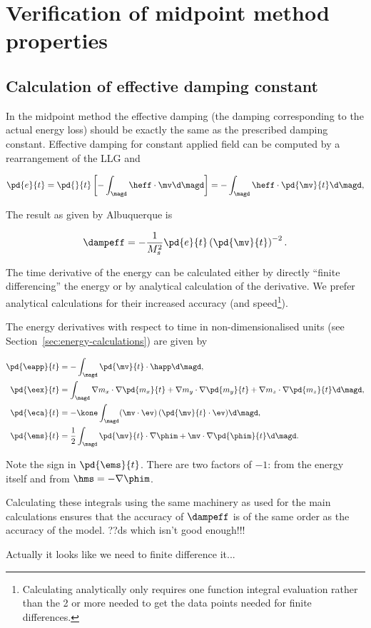 
\chapter{Verification of midpoint method properties}

\section{Calculation of effective damping constant}
\label{sec:exact-damp-const}

In the midpoint method the effective damping (\ie the damping corresponding to the actual energy loss) should be exactly the same as the prescribed damping constant.
Effective damping for constant applied field can be computed by a rearrangement of the LLG and

\begin{equation}
  \pd{e}{t} = \pd{}{t} \left[ - \int_\magd \heff \cdot \mv \d \magd \right] = - \int_\magd \heff \cdot \pd{\mv}{t} \d \magd,
\end{equation}

The result as given by Albuquerque \etal \cite{Albuquerque2001} is

\begin{equation}
  \dampeff = - \frac{1}{M_s^2} \pd{e}{t}  \left( \pd{\mv}{t} \right)^{-2}.
\end{equation}


The time derivative of the energy can be calculated either by directly ``finite differencing'' the energy or by analytical calculation of the derivative.
We prefer analytical calculations for their increased accuracy (and speed\footnote{Calculating analytically only requires one function integral evaluation rather than the 2 or more needed to get the data points needed for finite differences.}).

The energy derivatives with respect to time in non-dimensionalised units (see Section~\ref{sec:energy-calculations}) are given by

\begin{align}
  \pd{\eapp}{t} &= - \int_\magd \pd{\mv}{t} \cdot \happ \d\magd, \\
  \pd{\eex}{t} &= \int_\magd \nabla m_x \cdot \nabla \pd{m_x}{t}
           + \nabla m_y \cdot \nabla \pd{m_y}{t}
           + \nabla m_z \cdot \nabla \pd{m_z}{t} \d\magd, \\
  \pd{\eca}{t} &= - \kone \int_\magd (\mv \cdot \ev )\, (\pd{\mv}{t} \cdot \ev) \d\magd, \\
  \pd{\ems}{t} &= \frac{1}{2} \int_\magd \pd{\mv}{t} \cdot \nabla \phim
       + \mv \cdot \nabla \pd{\phim}{t} \d\magd.
\end{align}

Note the sign in $\pd{\ems}{t}$. There are two factors of $-1$: from the energy itself and from $\hms = - \nabla \phim$.

Calculating these integrals using the same machinery as used for the main calculations ensures that the accuracy of $\dampeff$ is of the same order as the accuracy of the model. ??ds which isn't good enough!!!

Actually it looks like we need to finite difference it...

